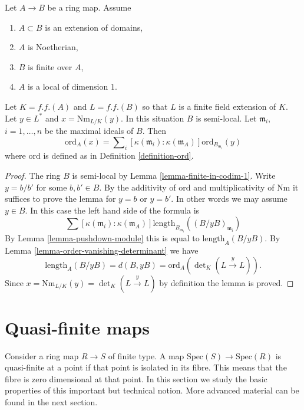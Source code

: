 \begin{lemma}
\label{lemma-finite-extension-dim-1}
Let $A \to B$ be a ring map.
Assume
\begin{enumerate}
\item $A \subset B$ is an extension of domains,
\item $A$ is Noetherian,
\item $B$ is finite over $A$,
\item $A$ is a local of dimension $1$.
\end{enumerate}
Let $K = f.f.(A)$ and $L = f.f.(B)$ so that $L$ is a
finite field extension of $K$.
Let $y \in L^*$ and $x = \text{Nm}_{L/K}(y)$.
In this situation $B$ is semi-local.
Let $\mathfrak m_i$, $i = 1, \ldots, n$ be the maximal ideals of $B$.
Then
$$
\text{ord}_A(x) =
\sum\nolimits_i
[\kappa(\mathfrak m_i) : \kappa(\mathfrak m_A)]
\text{ord}_{B_{\mathfrak m_i}}(y)
$$
where $\text{ord}$ is defined as in Definition \ref{definition-ord}.
\end{lemma}

\begin{proof}
The ring $B$ is semi-local by Lemma \ref{lemma-finite-in-codim-1}.
Write $y = b/b'$ for some $b, b' \in B$.
By the additivity of $\text{ord}$ and multiplicativity of
$\text{Nm}$ it suffices to prove the lemma for
$y = b$ or $y = b'$. In other words we may assume $y \in B$.
In this case the left hand side of the formula is
$$
\sum [\kappa(\mathfrak m_i) : \kappa(\mathfrak m_A)]
\text{length}_{B_{\mathfrak m_i}}((B/yB)_{\mathfrak m_i})
$$
By Lemma \ref{lemma-pushdown-module} this is equal to
$\text{length}_A(B/yB)$. By Lemma \ref{lemma-order-vanishing-determinant}
we have
$$
\text{length}_A(B/yB) = d(B, yB) =
\text{ord}_A(\det\nolimits_K(L \xrightarrow{y} L)).
$$
Since $x = \text{Nm}_{L/K}(y) = \det\nolimits_K(L \xrightarrow{y} L)$
by definition the lemma is proved.
\end{proof}















\section{Quasi-finite maps}
\label{section-quasi-finite}

\noindent
Consider a ring map $R \to S$ of finite type.
A map $\text{Spec}(S) \to \text{Spec}(R)$ is quasi-finite
at a point if that point is isolated in its fibre.
This means that the fibre is zero dimensional at that point.
In this section we study the basic properties of this
important but technical notion. More advanced material
can be found in the next section.

